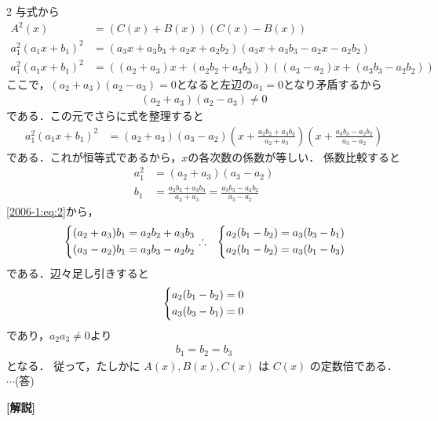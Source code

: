 \documentclass[../../../../main.tex]{subfiles}
\begin{document}
\begin{multicols}{2}
    与式から
    \begin{align*}
        A^2(x)              & = (C(x) + B(x))(C(x) - B(x))                                     \\
        a^2_1(a_1x + b_1)^2 & = (a_3x + a_3b_3 + a_2x + a_2b_2)(a_3x + a_3b_3 - a_2x - a_2b_2) \\
        a^2_1(a_1x + b_1)^2 & = ((a_2+a_3)x + (a_2b_2+a_3b_3))((a_3-a_2)x + (a_3b_3-a_2b_2))
    \end{align*}
    ここで，$(a_2+a_3)(a_2-a_3)=0$となると左辺の$a_1=0$となり矛盾するから
    \begin{align*}
        (a_2+a_3)(a_2-a_3) \neq 0
    \end{align*}
    である．この元でさらに式を整理すると
    \begin{align*}
        a^2_1(a_1x + b_1)^2 & = (a_2+a_3)(a_3-a_2)\left(x+\frac{a_2b_2+a_3b_3}{a_2+a_3}\right)\left(x+\frac{a_3b_3-a_2b_2}{a_3-a_2}\right)
    \end{align*}
    である．これが恒等式であるから，$x$の各次数の係数が等しい．
    係数比較すると
    \begin{align}
        a^2_1 & = (a_2+a_3)(a_3-a_2)                               \label{2006-1:eq:1}              \\
        b_1   & = \frac{a_2b_2+a_3b_3}{a_2+a_3} = \frac{a_3b_3-a_2b_2}{a_3-a_2} \label{2006-1:eq:2}
    \end{align}
    \cref{2006-1:eq:2}から，
    \begin{align*}
         & \begin{dcases}
               (a_2+a_3)b_1 = a_2b_2+a_3b_3 \\
               (a_3-a_2)b_1 = a_3b_3-a_2b_2
           \end{dcases}
        \therefore
         & \begin{dcases}
               a_2(b_1-b_2) = a_3(b_3-b_1) \\
               a_2(b_1-b_2) = a_3(b_1-b_3)
           \end{dcases}
    \end{align*}
    である．辺々足し引きすると
    \begin{align*}
        \begin{dcases}
            a_2(b_1-b_2) = 0 \\
            a_3(b_3-b_1) = 0
        \end{dcases}
    \end{align*}
    であり，$a_2a_3\neq 0$より
    \begin{align*}
        b_1=b_2=b_3
    \end{align*}
    となる．
    従って，たしかに $A(x), B(x), C(x)$ は $C(x)$ の定数倍である． $\cdots$(答)

    {\bf[解説]}

    \newpage
\end{multicols}
\end{document}
